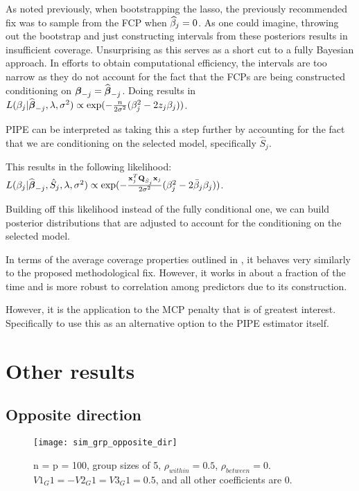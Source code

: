 As noted previously, when bootstrapping the lasso, the previously recommended fix was to sample from the FCP when $\widehat{\beta}_j = 0$. As one could imagine, throwing out the bootstrap and just constructing intervals from these posteriors results in insufficient coverage. Unsurprising as this serves as a short cut to a fully Bayesian approach. In efforts to obtain computational efficiency, the intervals are too narrow as they do not account for the fact that the FCPs are being constructed conditioning on $\boldsymbol{\beta}_{-j} = \widehat{\boldsymbol{\beta}}_{-j}$. Doing results in $L(\beta_j|\widehat{\boldsymbol{\beta}}_{-j}, \lambda, \sigma^2) \propto \exp(-\frac{n}{2\sigma^2}(\beta_{j}^2 - 2 z_{j} \beta_{j}))$.

PIPE can be interpreted as taking this a step further by accounting for the fact that we are conditioning on the selected model, specifically $\hat{S}_j$. 


This results in the following likelihood: $L(\beta_j|\widehat{\boldsymbol{\beta}}_{-j}, \hat{S}_j, \lambda, \sigma^2) \propto \exp(-\frac{\mathbf{x}_j^T \mathbf{Q}_{\hat{S}_j} \mathbf{x}_j}{2\sigma^2}(\beta_{j}^2 - 2 \bar{\beta}_{j} \beta_{j}))$. 

Building off this likelihood instead of the fully conditional one, we can build posterior distributions that are adjusted to account for the conditioning on the selected model.

In terms of the average coverage properties outlined in , it behaves very similarly to the proposed methodological fix. However, it works in about a fraction of the time and is more robust to correlation among predictors due to its construction. 

However, it is the application to the MCP penalty that is of greatest interest. Specifically to use this as an alternative option to the PIPE estimator itself.

\section{Other results}

\subsection{Opposite direction}

\begin{figure}[hbtp]
    \begin{center}
    \texttt{[image: sim\_grp\_opposite\_dir]}
    \caption{\label{Fig:sim_grp_opposite_dir} n = p = 100, group sizes of 5, $\rho_{within} = 0.5$, $\rho_{between} = 0$. $V1_G1 = -V2_G1 = V3_G1 = 0.5$, and all other coefficients are 0.}
    \end{center}
\end{figure}

